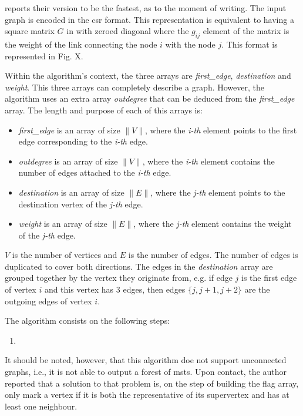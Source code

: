 \cite{Sousa2015} reports their version to be the fastest, as to the moment of writing. The input graph is encoded in the \gls{csr} format. This representation is equivalent to having a square matrix $G$ in with zeroed diagonal where the $g_{ij}$ element of the matrix is the weight of the link connecting the node $i$ with the node $j$. This format is represented in Fig. X. %

Within the algorithm's context, the three arrays are \emph{first\_edge}, \emph{destination} and \emph{weight}. This three arrays can completely describe a graph. However, the algorithm uses an extra array \emph{outdegree} that can be deduced from the \emph{first\_edge} array. The length and purpose of each of this arrays is:
\begin{itemize}
	\item \emph{first\_edge} is an array of size $\|V\|$, where the \emph{i-th} element points to the first edge corresponding to the \emph{i-th} edge.
	\item \emph{outdegree} is an array of size $\|V\|$, where the \emph{i-th} element contains the number of edges attached to the \emph{i-th} edge.
	\item \emph{destination} is an array of size $\|E\|$, where the \emph{j-th} element points to the destination vertex of the \emph{j-th} edge.
	\item \emph{weight} is an array of size $\|E\|$, where the \emph{j-th} element contains the weight of the \emph{j-th} edge.
\end{itemize}

$V$ is the number of vertices and $E$ is the number of edges. The number of edges is duplicated to cover both directions. The edges in the \emph{destination} array are grouped together by the vertex they originate from, e.g. if edge $j$ is the first edge of vertex $i$ and this vertex has 3 edges, then edges $\{j,j+1,j+2\}$ are the outgoing edges of vertex $i$.



The algorithm consists on the following steps:

\begin{enumerate}
	\item 
\end{enumerate}


It should be noted, however, that this algorithm doe not support unconnected graphs, i.e., it is not able to output a forest of \gls{mst}s.
Upon contact, the author reported that a solution to that problem is, on the step of building the flag array, only mark a vertex if it is both the representative of its supervertex and has at least one neighbour.

